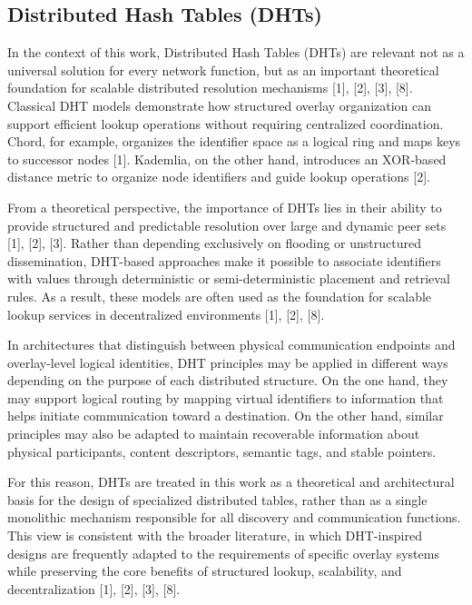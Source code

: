 \documentclass[12pt,a4paper]{article}
\begin{document}
\subsection{Distributed Hash Tables (DHTs)}

In the context of this work, Distributed Hash Tables (DHTs) are relevant not as a
universal solution for every network function, but as an important theoretical
foundation for scalable distributed resolution mechanisms [1], [2], [3], [8].
Classical DHT models demonstrate how structured overlay organization can support
efficient lookup operations without requiring centralized coordination. Chord, for
example, organizes the identifier space as a logical ring and maps keys to successor
nodes [1]. Kademlia, on the other hand, introduces an XOR-based distance metric to
organize node identifiers and guide lookup operations [2].

From a theoretical perspective, the importance of DHTs lies in their ability to
provide structured and predictable resolution over large and dynamic peer sets
[1], [2], [3]. Rather than depending exclusively on flooding or unstructured
dissemination, DHT-based approaches make it possible to associate identifiers with
values through deterministic or semi-deterministic placement and retrieval rules.
As a result, these models are often used as the foundation for scalable lookup
services in decentralized environments [1], [2], [8].

In architectures that distinguish between physical communication endpoints and
overlay-level logical identities, DHT principles may be applied in different ways
depending on the purpose of each distributed structure. On the one hand, they may
support logical routing by mapping virtual identifiers to information that helps
initiate communication toward a destination. On the other hand, similar principles
may also be adapted to maintain recoverable information about physical
participants, content descriptors, semantic tags, and stable pointers.

For this reason, DHTs are treated in this work as a theoretical and architectural
basis for the design of specialized distributed tables, rather than as a single
monolithic mechanism responsible for all discovery and communication functions.
This view is consistent with the broader literature, in which DHT-inspired designs
are frequently adapted to the requirements of specific overlay systems while
preserving the core benefits of structured lookup, scalability, and decentralization
[1], [2], [3], [8].
\end{document}
